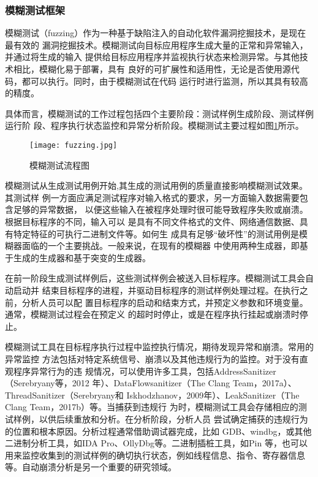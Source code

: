 
\subsubsection{模糊测试框架}
模糊测试（fuzzing）作为一种基于缺陷注入的自动化软件漏洞挖掘技术，是现在最有效的
漏洞挖掘技术。模糊测试向目标应用程序生成大量的正常和异常输入，并通过将生成的输入
提供给目标应用程序并监视执行状态来检测异常。与其他技术相比，模糊化易于部署，具有
良好的可扩展性和适用性，无论是否使用源代码，都可以执行。同时，由于模糊测试在代码
运行时进行监测，所以其具有较高的精度。

具体而言，模糊测试的工作过程包括四个主要阶段：测试样例生成阶段、测试样例运行阶
段、程序执行状态监控和异常分析阶段。模糊测试主要过程如图\ref{fig:fuzzing}所示。
\begin{figure}[ht]
	\centering
	\texttt{[image: fuzzing.jpg]}
	\caption{模糊测试流程图}
	\label{fig:fuzzing}
\end{figure}

模糊测试从生成测试用例开始,其生成的测试用例的质量直接影响模糊测试效果。其测试样
例一方面应满足测试程序对输入格式的要求，另一方面输入数据需要包含足够的异常数据，
以便这些输入在被程序处理时很可能导致程序失败或崩溃。根据目标程序的不同，输入可以
是具有不同文件格式的文件、网络通信数据、具有特定特征的可执行二进制文件等。如何生
成具有足够“破坏性”的测试用例是模糊器面临的一个主要挑战。一般来说，在现有的模糊器
中使用两种生成器，即基于生成的生成器和基于突变的生成器。

在前一阶段生成测试样例后，这些测试样例会被送入目标程序。模糊测试工具会自动启动并
结束目标程序的进程，并驱动目标程序的测试样例处理过程。在执行之前，分析人员可以配
置目标程序的启动和结束方式，并预定义参数和环境变量。通常，模糊测试过程会在预定义
的超时时停止，或是在程序执行挂起或崩溃时停止。

模糊测试工具在目标程序执行过程中监控执行情况，期待发现异常和崩溃。常用的异常监控
方法包括对特定系统信号、崩溃以及其他违规行为的监控。对于没有直观程序异常行为的违
规情况，可以使用许多工具，包括AddressSanitizer（Serebryany等，2012
年）、DataFlowsanitizer（The Clang Team，2017a）、ThreadSanitizer（Serebryany和
Iskhodzhanov，2009年）、LeakSanitizer（The Clang Team，2017b）等。当捕获到违规行
为时，模糊测试工具会存储相应的测试样例，以供后续重放和分析。在分析阶段，分析人员
尝试确定捕获的违规行为的位置和根本原因。分析过程通常借助调试器完成，比如
GDB、windbg，或其他二进制分析工具，如IDA Pro、OllyDbg等。二进制插桩工具，如Pin
等，也可以用来监控收集到的测试样例的确切执行状态，例如线程信息、指令、寄存器信息
等。自动崩溃分析是另一个重要的研究领域。

